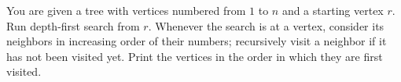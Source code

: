 You are given a tree with vertices numbered from $1$ to $n$ and a starting vertex $r$. Run depth-first search from $r$. Whenever the search is at a vertex, consider its neighbors in increasing order of their numbers; recursively visit a neighbor if it has not been visited yet. Print the vertices in the order in which they are first visited.
